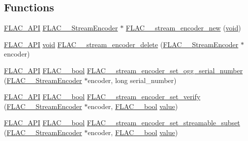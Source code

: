 \subsection*{Functions}
\begin{DoxyCompactItemize}
\item 
\mbox{\hyperlink{group__flac__export_ga56ca07df8a23310707732b1c0007d6f5}{F\+L\+A\+C\+\_\+\+A\+PI}} \mbox{\hyperlink{struct_f_l_a_c_____stream_encoder}{F\+L\+A\+C\+\_\+\+\_\+\+Stream\+Encoder}} $\ast$ \mbox{\hyperlink{group__flac__stream__encoder_ga35f3d94452bcf0a90a31c7d770b200bc}{F\+L\+A\+C\+\_\+\+\_\+stream\+\_\+encoder\+\_\+new}} (\mbox{\hyperlink{_s_d_l__opengles2__gl2ext_8h_ae5d8fa23ad07c48bb609509eae494c95}{void}})
\item 
\mbox{\hyperlink{group__flac__export_ga56ca07df8a23310707732b1c0007d6f5}{F\+L\+A\+C\+\_\+\+A\+PI}} \mbox{\hyperlink{_s_d_l__opengles2__gl2ext_8h_ae5d8fa23ad07c48bb609509eae494c95}{void}} \mbox{\hyperlink{group__flac__stream__encoder_ga9c9956af42bebe923da59437628aa9ea}{F\+L\+A\+C\+\_\+\+\_\+stream\+\_\+encoder\+\_\+delete}} (\mbox{\hyperlink{struct_f_l_a_c_____stream_encoder}{F\+L\+A\+C\+\_\+\+\_\+\+Stream\+Encoder}} $\ast$encoder)
\item 
\mbox{\hyperlink{group__flac__export_ga56ca07df8a23310707732b1c0007d6f5}{F\+L\+A\+C\+\_\+\+A\+PI}} \mbox{\hyperlink{ordinals_8h_a95103469f1cbd78b8cf250194985b34e}{F\+L\+A\+C\+\_\+\+\_\+bool}} \mbox{\hyperlink{group__flac__stream__encoder_ga646c9800d42620a6c504fbdfbd092666}{F\+L\+A\+C\+\_\+\+\_\+stream\+\_\+encoder\+\_\+set\+\_\+ogg\+\_\+serial\+\_\+number}} (\mbox{\hyperlink{struct_f_l_a_c_____stream_encoder}{F\+L\+A\+C\+\_\+\+\_\+\+Stream\+Encoder}} $\ast$encoder, long serial\+\_\+number)
\item 
\mbox{\hyperlink{group__flac__export_ga56ca07df8a23310707732b1c0007d6f5}{F\+L\+A\+C\+\_\+\+A\+PI}} \mbox{\hyperlink{ordinals_8h_a95103469f1cbd78b8cf250194985b34e}{F\+L\+A\+C\+\_\+\+\_\+bool}} \mbox{\hyperlink{group__flac__stream__encoder_ga5f4ac18a7207d2864fed72d284486f9e}{F\+L\+A\+C\+\_\+\+\_\+stream\+\_\+encoder\+\_\+set\+\_\+verify}} (\mbox{\hyperlink{struct_f_l_a_c_____stream_encoder}{F\+L\+A\+C\+\_\+\+\_\+\+Stream\+Encoder}} $\ast$encoder, \mbox{\hyperlink{ordinals_8h_a95103469f1cbd78b8cf250194985b34e}{F\+L\+A\+C\+\_\+\+\_\+bool}} \mbox{\hyperlink{_s_d_l__opengl__glext_8h_a8ad81492d410ff2ac11f754f4042150f}{value}})
\item 
\mbox{\hyperlink{group__flac__export_ga56ca07df8a23310707732b1c0007d6f5}{F\+L\+A\+C\+\_\+\+A\+PI}} \mbox{\hyperlink{ordinals_8h_a95103469f1cbd78b8cf250194985b34e}{F\+L\+A\+C\+\_\+\+\_\+bool}} \mbox{\hyperlink{group__flac__stream__encoder_ga163f1acfe8b6b8ae849f0f4f7c0708f4}{F\+L\+A\+C\+\_\+\+\_\+stream\+\_\+encoder\+\_\+set\+\_\+streamable\+\_\+subset}} (\mbox{\hyperlink{struct_f_l_a_c_____stream_encoder}{F\+L\+A\+C\+\_\+\+\_\+\+Stream\+Encoder}} $\ast$encoder, \mbox{\hyperlink{ordinals_8h_a95103469f1cbd78b8cf250194985b34e}{F\+L\+A\+C\+\_\+\+\_\+bool}} \mbox{\hyperlink{_s_d_l__opengl__glext_8h_a8ad81492d410ff2ac11f754f4042150f}{value}})

\end{DoxyCompactItemize}

